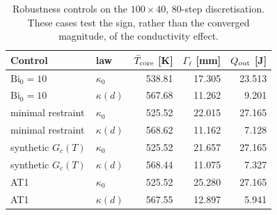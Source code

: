 \begin{table}[H]
\centering
\caption{Robustness controls on the $100\times40$, 80-step discretisation. These cases test the sign, rather than the converged magnitude, of the conductivity effect.}
\label{tab:control-results}
\small
\begin{tabular}{@{}llrrr@{}}
\toprule
Control & law & $\bar T_{\rm core}$ [K] & $\Gamma_\ell$ [mm] & $Q_{\rm out}$ [J] \\
\midrule
$\mathrm{Bi}_0=10$ & $\kappa_0$ & 538.81 & 17.305 & 23.513 \\
$\mathrm{Bi}_0=10$ & $\kappa(d)$ & 567.68 & 11.262 & 9.201 \\
\addlinespace[2pt]
minimal restraint & $\kappa_0$ & 525.52 & 22.015 & 27.165 \\
minimal restraint & $\kappa(d)$ & 568.62 & 11.162 & 7.128 \\
\addlinespace[2pt]
synthetic $G_c(T)$ & $\kappa_0$ & 525.52 & 21.657 & 27.165 \\
synthetic $G_c(T)$ & $\kappa(d)$ & 568.44 & 11.075 & 7.327 \\
\addlinespace[2pt]
AT1 & $\kappa_0$ & 525.52 & 25.280 & 27.165 \\
AT1 & $\kappa(d)$ & 567.55 & 12.897 & 5.941 \\
\bottomrule
\end{tabular}
\end{table}

